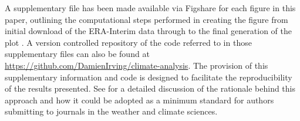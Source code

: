 A supplementary file has been made available via Figshare for each figure in this paper, outlining the computational steps performed in creating the figure from initial download of the ERA-Interim data through to the final generation of the plot \citep{Irving2015}. A version controlled repository of the code referred to in those supplementary files can also be found at \url{https://github.com/DamienIrving/climate-analysis}. The provision of this supplementary information and code is designed to facilitate the reproducibility of the results presented. See \citet{Irving2016} for a detailed discussion of the rationale behind this approach and how it could be adopted as a minimum standard for authors submitting to journals in the weather and climate sciences. 